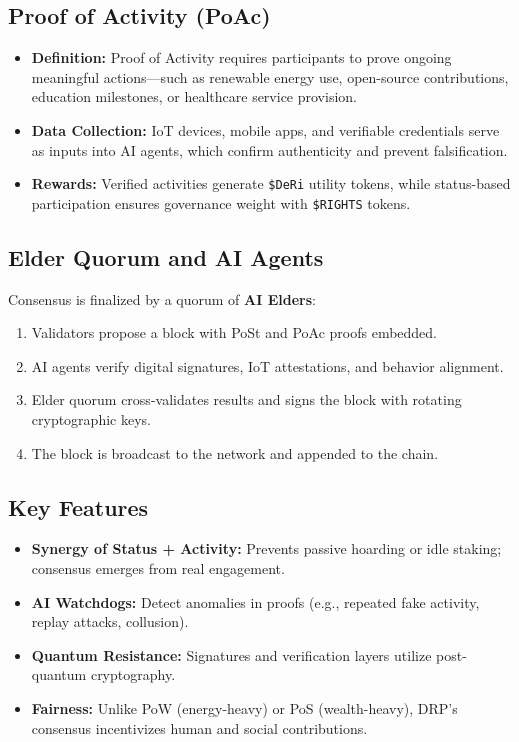 \documentclass[11pt,a4paper]{article}
\begin{document}
\subsection{Proof of Activity (PoAc)}
\begin{itemize}
    \item \textbf{Definition:} Proof of Activity requires participants to prove ongoing meaningful actions—such as renewable energy use, open-source contributions, education milestones, or healthcare service provision.
    \item \textbf{Data Collection:} IoT devices, mobile apps, and verifiable credentials serve as inputs into AI agents, which confirm authenticity and prevent falsification.
    \item \textbf{Rewards:} Verified activities generate \texttt{\$DeRi} utility tokens, while status-based participation ensures governance weight with \texttt{\$RIGHTS} tokens.
\end{itemize}

\subsection{Elder Quorum and AI Agents}
Consensus is finalized by a quorum of \textbf{AI Elders}:
\begin{enumerate}
    \item Validators propose a block with PoSt and PoAc proofs embedded.
    \item AI agents verify digital signatures, IoT attestations, and behavior alignment.
    \item Elder quorum cross-validates results and signs the block with rotating cryptographic keys.
    \item The block is broadcast to the network and appended to the chain.
\end{enumerate}

\subsection{Key Features}
\begin{itemize}
    \item \textbf{Synergy of Status + Activity:} Prevents passive hoarding or idle staking; consensus emerges from real engagement.
    \item \textbf{AI Watchdogs:} Detect anomalies in proofs (e.g., repeated fake activity, replay attacks, collusion).
    \item \textbf{Quantum Resistance:} Signatures and verification layers utilize post-quantum cryptography.
    \item \textbf{Fairness:} Unlike PoW (energy-heavy) or PoS (wealth-heavy), DRP’s consensus incentivizes human and social contributions.
\end{itemize}
\end{document}
